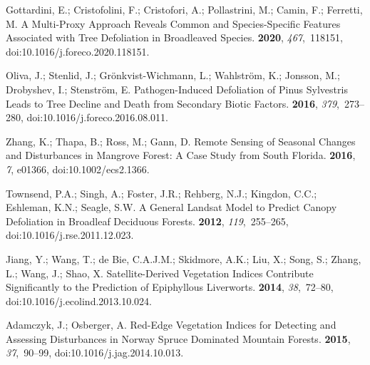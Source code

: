 \documentclass[remotesensing,article,accept,moreauthors,pdftex]{Definitions/mdpi}
\begin{document}
\begin{thebibliography}{999}
Gottardini, E.; Cristofolini, F.; Cristofori, A.; Pollastrini, M.; Camin, F.;
  Ferretti, M.
\newblock A Multi-Proxy Approach Reveals Common and Species-Specific Features
  Associated with Tree Defoliation in Broadleaved Species.
 {\bf 2020}, {\em 467},~118151, doi:10.1016/j.foreco.2020.118151.

Oliva, J.; Stenlid, J.; {Gr{\"o}nkvist-Wichmann}, L.; Wahlstr{\"o}m, K.;
  Jonsson, M.; Drobyshev, I.; Stenstr{\"o}m, E.
\newblock Pathogen-Induced Defoliation of {{Pinus}} Sylvestris Leads to Tree
  Decline and Death from Secondary Biotic Factors.
 {\bf 2016}, {\em 379},~273--280, doi:10.1016/j.foreco.2016.08.011.

Zhang, K.; Thapa, B.; Ross, M.; Gann, D.
\newblock Remote Sensing of Seasonal Changes and Disturbances in Mangrove
  Forest: A Case Study from {{South Florida}}.
 {\bf 2016}, \emph{7}, e01366, doi:10.1002/ecs2.1366.

Townsend, P.A.; Singh, A.; Foster, J.R.; Rehberg, N.J.; Kingdon, C.C.;
  Eshleman, K.N.; Seagle, S.W.
\newblock A General {{Landsat}} Model to Predict Canopy Defoliation in
  Broadleaf Deciduous Forests.
 {\bf 2012}, {\em 119},~255--265, doi:10.1016/j.rse.2011.12.023.

Jiang, Y.; Wang, T.; {de Bie}, C.A.J.M.; Skidmore, A.K.; Liu, X.; Song, S.;
  Zhang, L.; Wang, J.; Shao, X.
\newblock Satellite-Derived Vegetation Indices Contribute Significantly to the
  Prediction of Epiphyllous Liverworts.
 {\bf 2014}, {\em 38},~72--80, doi:10.1016/j.ecolind.2013.10.024.

Adamczyk, J.; Osberger, A.
\newblock Red-Edge Vegetation Indices for Detecting and Assessing Disturbances
  in {{Norway}} Spruce Dominated Mountain Forests.
 {\bf 2015}, {\em 37},~90--99, doi:10.1016/j.jag.2014.10.013.


\end{thebibliography}
\end{document}
